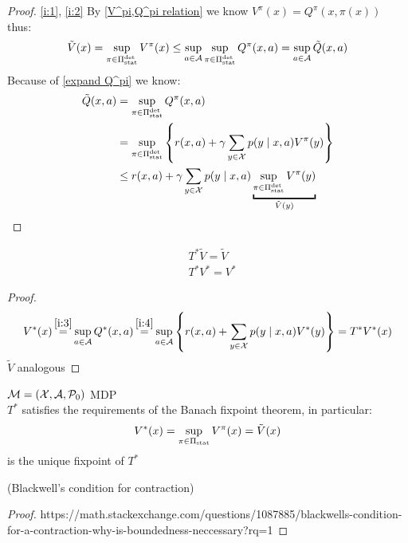 \begin{proof} \ref{i:1}, \ref{i:2}
By \ref{V^pi,Q^pi relation} we know \(V^\pi(x)=Q^\pi(x,\pi(x))\) thus:
\begin{align*}
	\tilde{V}(x) =\sup_{\pi \in \Pi_{\textnormal{stat}}^{\textnormal{det}}} V^\pi(x) \le \sup_{a\in \mathcal{A}}\sup_{\pi\in\Pi_{\textnormal{stat}}^{\textnormal{det}}} Q^\pi(x,a)
	=\sup_{a\in \mathcal{A}} \tilde{Q}(x,a)
\end{align*}
Because of \ref{expand Q^pi} we know:
\begin{align*}
	\tilde{Q}(x,a)&=\sup_{\pi\in\detPolicy}Q^\pi(x,a) \\
	&= \sup_{\pi\in\detPolicy} \left\{ r(x,a)+\gamma\sum\limits_{y\in\cX}p(y\mid x,a) V^\pi(y) \right\}\\
	&\le r(x,a)+\gamma\sum\limits_{y\in\cX}p(y\mid x,a) \underbracket{\sup_{\pi\in\detPolicy} V^\pi(y)}_{\tilde{V}(y)} \\
\end{align*}
\end{proof}


\begin{corollary}
	\begin{align*}
	&T^*\tilde{V}=\tilde{V}\\
	&T^*V^*=V^*
	\end{align*}
\end{corollary}

\begin{proof}
\begin{align*}
	V^*(x)\xeq{\ref{i:3}}\sup_{a\in\cA}Q^*(x,a)\xeq{\ref{i:4}}\sup_{a\in\cA}\left\{r(x,a)+\sum_{y\in\cX}p(y\mid x,a) V^*(y)\right\} =T^*V^*(x)
\end{align*}
\(\tilde{V}\) analogous
\end{proof}


\begin{thm}\(\mathcal{M}=(\mathcal{X},\mathcal{A},\mathcal{P}_0)\) MDP\\
\(T^*\) satisfies the requirements of the Banach fixpoint theorem, in particular:
	\[V^*(x)=\sup_{\pi\in\Pi_{\textnormal{stat}}}V^\pi(x)=\tilde{V}(x) \]
is the unique fixpoint of \(T^*\)
\end{thm}

\begin{lemma}(Blackwell's condition for contraction)
\end{lemma}

\begin{proof}
https://math.stackexchange.com/questions/1087885/blackwells-condition-for-a-contraction-why-is-boundedness-neccessary?rq=1
\end{proof}

